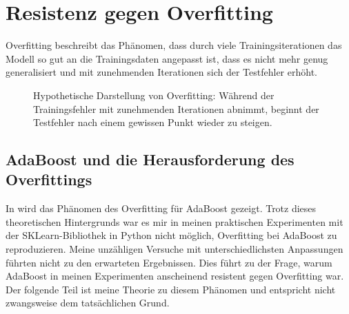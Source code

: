 \section{Resistenz gegen Overfitting}
Overfitting beschreibt das Phänomen, dass durch viele Trainingsiterationen das Modell so gut an die Trainingsdaten angepasst ist, dass es nicht mehr genug generalisiert und mit zunehmenden Iterationen sich der Testfehler erhöht.

\begin{figure}[H]
    \centering
    \caption{Hypothetische Darstellung von Overfitting: Während der Trainingsfehler mit zunehmenden Iterationen abnimmt, beginnt der Testfehler nach einem gewissen Punkt wieder zu steigen.}
\end{figure}


\subsection{AdaBoost und die Herausforderung des Overfittings}
In \textcite[Kapitel 1.2.3]{SchapireFreund2012} wird das Phänomen des Overfitting für AdaBoost gezeigt. Trotz dieses theoretischen Hintergrunds war es mir in meinen praktischen Experimenten mit der SKLearn-Bibliothek in Python nicht möglich, Overfitting bei AdaBoost zu reproduzieren. Meine unzähligen Versuche mit unterschiedlichsten Anpassungen führten nicht zu den erwarteten Ergebnissen. Dies führt zu der Frage, warum AdaBoost in meinen Experimenten anscheinend resistent gegen Overfitting war. Der folgende Teil ist meine Theorie zu diesem Phänomen und entspricht nicht zwangsweise dem tatsächlichen Grund.

